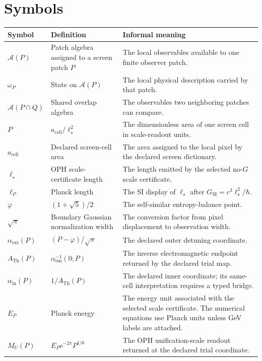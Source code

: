 \documentclass[11pt]{article}
\theoremstyle{remark}
\newcommand{\A}{\mathcal A}
\newcommand{\e}{\mathrm e}
\newcommand{\ATh}{A_{\mathrm{Th}}}
\begin{document}
\section{Symbols}

\begin{longtable}{@{}L{0.20\textwidth}L{0.32\textwidth}L{0.38\textwidth}@{}}
\toprule
Symbol & Definition & Informal meaning \\
\midrule
\endhead
\(\A(P)\) & Patch algebra assigned to a screen patch \(P\) & The local observables available to one finite observer patch. \\
\(\omega_P\) & State on \(\A(P)\) & The local physical description carried by that patch. \\
\(\A(P\cap Q)\) & Shared overlap algebra & The observables two neighboring patches can compare. \\
\(P\) & \(a_{\mathrm{cell}}/\ell_\star^2\) & The dimensionless area of one screen cell in scale-readout units. \\
\(a_{\mathrm{cell}}\) & Declared screen-cell area & The area assigned to the local pixel by the declared screen dictionary. \\
\(\ell_\star\) & OPH scale-certificate length & The length emitted by the selected no-\(G\) scale certificate. \\
\(\ell_P\) & Planck length & The SI display of \(\ell_\star\) after \(G_{\mathrm{SI}}=c^3\ell_\star^2/\hbar\). \\
\(\varphi\) & \((1+\sqrt5)/2\) & The self-similar entropy-balance point. \\
\(\sqrt\pi\) & Boundary Gaussian normalization width & The conversion factor from pixel displacement to observation width. \\
\(\alpha_{\mathrm{ext}}(P)\) & \((P-\varphi)/\sqrt\pi\) & The declared outer detuning coordinate. \\
\(\ATh(P)\) & \(\alpha_{\mathrm{em}}^{-1}(0;P)\) & The inverse electromagnetic endpoint returned by the declared trial map. \\
\(\alpha_{\mathrm{in}}(P)\) & \(1/\ATh(P)\) & The declared inner coordinate; its same-cell interpretation requires a typed bridge. \\
\(E_P\) & Planck energy & The energy unit associated with the selected scale certificate. The numerical equations use Planck units unless GeV labels are attached. \\
\(M_U(P)\) & \(E_P\e^{-2\pi}P^{1/6}\) & The OPH unification-scale readout returned at the declared trial coordinate. \\

\end{longtable}
\end{document}
